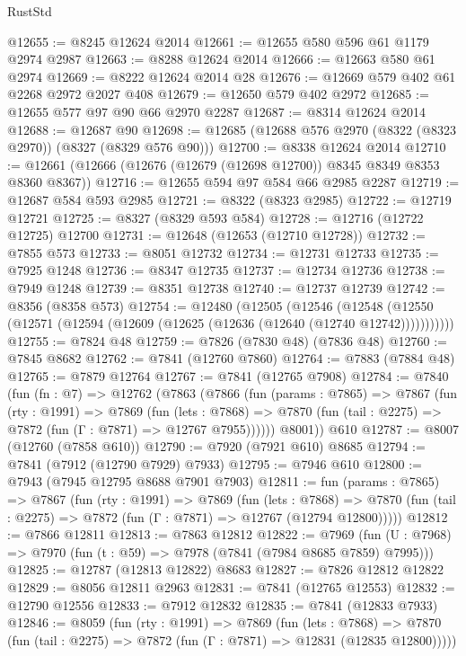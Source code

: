 \begin{lexlean}{RustStd}
\begin{coremodule}
{\begin{coremodule}
{{{{{{{{{{{{{{{{{{{{{{{{{{{{{{{{{{{{{{{{{{{{{{{{{{{{{{@12655 := @8245 @12624 @2014
@12661 := @12655 @580 @596 @61 @1179 @2974 @2987
@12663 := @8288 @12624 @2014
@12666 := @12663 @580 @61 @2974
@12669 := @8222 @12624 @2014 @28
@12676 := @12669 @579 @402 @61 @2268 @2972 @2027 @408
@12679 := @12650 @579 @402 @2972
@12685 := @12655 @577 @97 @90 @66 @2970 @2287
@12687 := @8314 @12624 @2014
@12688 := @12687 @90
@12698 := @12685 (@12688 @576 @2970 (@8322 (@8323 @2970)) (@8327 (@8329 @576 @90)))
@12700 := @8338 @12624 @2014
@12710 := @12661 (@12666 (@12676 (@12679 (@12698 @12700)) @8345 @8349 @8353 @8360 @8367))
@12716 := @12655 @594 @97 @584 @66 @2985 @2287
@12719 := @12687 @584 @593 @2985
@12721 := @8322 (@8323 @2985)
@12722 := @12719 @12721
@12725 := @8327 (@8329 @593 @584)
@12728 := @12716 (@12722 @12725) @12700
@12731 := @12648 (@12653 (@12710 @12728))
@12732 := @7855 @573
@12733 := @8051 @12732
@12734 := @12731 @12733
@12735 := @7925 @1248
@12736 := @8347 @12735
@12737 := @12734 @12736
@12738 := @7949 @1248
@12739 := @8351 @12738
@12740 := @12737 @12739
@12742 := @8356 (@8358 @573)
@12754 := @12480
    (@12505
      (@12546
        (@12548 (@12550 (@12571 (@12594 (@12609 (@12625 (@12636 (@12640 (@12740 @12742)))))))))))
@12755 := @7824 @48
@12759 := @7826 (@7830 @48) (@7836 @48)
@12760 := @7845 @8682
@12762 := @7841 (@12760 @7860)
@12764 := @7883 (@7884 @48)
@12765 := @7879 @12764
@12767 := @7841 (@12765 @7908)
@12784 := @7840
    (fun (fn : @7) =>
    @12762
      (@7863
        (@7866
          (fun (params : @7865) =>
          @7867
            (fun (rty : @1991) =>
            @7869
              (fun (lets : @7868) =>
              @7870 (fun (tail : @2275) => @7872 (fun (Γ : @7871) => @12767 @7955))))))
        @8001))
    @610
@12787 := @8007 (@12760 (@7858 @610))
@12790 := @7920 (@7921 @610) @8685
@12794 := @7841 (@7912 (@12790 @7929) @7933)
@12795 := @7946 @610
@12800 := @7943 (@7945 @12795 @8688 @7901 @7903)
@12811 := fun (params : @7865) =>
  @7867
    (fun (rty : @1991) =>
    @7869
      (fun (lets : @7868) =>
      @7870 (fun (tail : @2275) => @7872 (fun (Γ : @7871) => @12767 (@12794 @12800)))))
@12812 := @7866 @12811
@12813 := @7863 @12812
@12822 := @7969
    (fun (U : @7968) => @7970 (fun (t : @59) => @7978 (@7841 (@7984 @8685 @7859) @7995)))
@12825 := @12787 (@12813 @12822) @8683
@12827 := @7826 @12812 @12822
@12829 := @8056 @12811 @2963
@12831 := @7841 (@12765 @12553)
@12832 := @12790 @12556
@12833 := @7912 @12832
@12835 := @7841 (@12833 @7933)
@12846 := @8059
    (fun (rty : @1991) =>
    @7869
      (fun (lets : @7868) =>
      @7870 (fun (tail : @2275) => @7872 (fun (Γ : @7871) => @12831 (@12835 @12800)))))
}}}}}}}}}}}}}}}}}}}}}}}}}}}}}}}}}}}}}}}}}}}}}}}}}}}}}}
\end{coremodule}}
\end{coremodule}
\end{lexlean}
